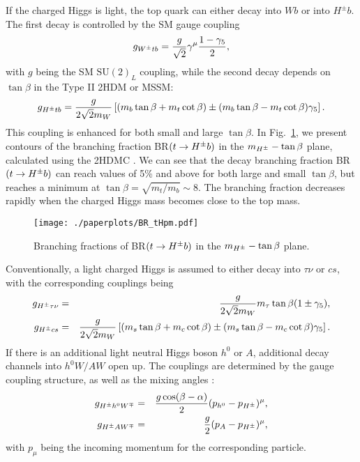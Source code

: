 If the charged Higgs is light, the top quark can either decay into $Wb$ or into $H^{\pm}b$. The first decay is controlled by the SM gauge coupling
\begin{equation}
g_{W^{\pm} tb} = \frac{g}{\sqrt{2}} \gamma^\mu \frac{1-\gamma_5}{2}, 
\end{equation}
with $g$ being the SM $\text{SU}(2)_L$ coupling, while the second decay depends on  $\tan\beta$ in the Type II 2HDM or MSSM:
\begin{equation}
g_{H^{\pm} tb} = \frac{g}{2 \sqrt{2} m_W} \left[ (m_b \tan \beta + m_t \cot \beta ) \pm (m_b \tan \beta - m_t \cot \beta ) \gamma_5 \right].
\end{equation}
This coupling is enhanced for both small and large $\tan\beta$.  In  Fig.~\ref{fig:tBR}, we present contours of the branching fraction BR$(t \to H^{\pm} b)$ in the $m_{H^{\pm}}-\tan\beta$ plane, calculated  using the 2HDMC \cite{Eriksson:2009ws}.  We can see that the decay branching fraction BR$(t \to H^{\pm} b)$ can reach values of 5\% and above for both large and small $\tan\beta$,  but reaches a minimum at $\tan\beta = \sqrt{m_t/m_b}\sim 8 $. The branching fraction decreases rapidly when the charged Higgs mass becomes close to the top mass.
\begin{figure}[h!]
\centering
	\texttt{[image: ./paperplots/BR\_tHpm.pdf]}
\caption{Branching fractions of  BR$(t \to H^{\pm} b)$ in the $m_{H^{\pm}}-\tan\beta$ plane. }
\label{fig:tBR}
\end{figure}

Conventionally, a light charged Higgs is assumed to either decay into $\tau\nu$ or $cs$, with the corresponding couplings being
\begin{eqnarray}
g_{H^{\pm} \tau\nu} &=& \frac{g}{2 \sqrt{2} m_W} m_\tau \tan \beta(1\pm    \gamma_5 ), \\
g_{H^{\pm} cs} &=& \frac{g}{2 \sqrt{2} m_W} \left[ (m_s \tan \beta + m_c \cot \beta ) \pm (m_s \tan \beta - m_c \cot \beta ) \gamma_5 \right].
 \label{eqn:hc-smcouplings}
 \end{eqnarray}
If there is an additional light neutral Higgs boson $h^0$ or $A$, additional decay channels into $h^0 W/AW$ open up. The couplings are determined by the gauge coupling structure, as well as the mixing angles \cite{Gunion:1989we}:  
\begin{eqnarray}
 g_{H^{\pm} h^0 W^{\mp}}&=& \frac{g\cos(\beta-\alpha)}{2}(p_{h^0}-p_{H^{\pm}})^\mu,  \\
 g_{H^{\pm} A W^{\mp}}&=& \frac{g}{2}(p_{A}-p_{H^{\pm}})^\mu,  
 \label{eqn:hc-bsmcouplings}
 \end{eqnarray}
 with  $p_\mu$ being the incoming momentum for the corresponding particle. 

